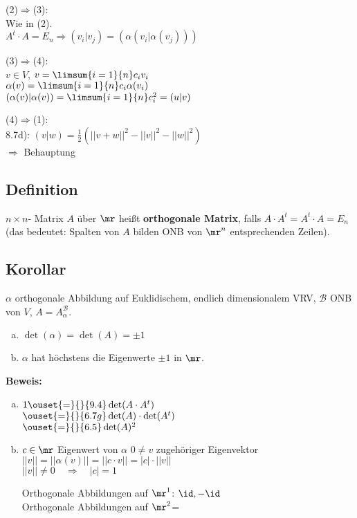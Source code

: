 	(2)$ \Rightarrow $(3):\\
	Wie in (2).\\
	$ A^t\cdot A=E_n\Rightarrow(v_i|v_j)=(\alpha(v_i|\alpha(v_j))) $
	
	(3)$ \Rightarrow $(4):\\
	$ v\in V $, $ v=\limsum{i=1}{n}c_iv_i $\\
	$ \alpha(v)=\limsum{i=1}{n}c_i\alpha(v_i) $\\
	$ (\alpha(v)|\alpha(v))=\limsum{i=1}{n}c_i^2=(u|v) $
	
	(4)$ \Rightarrow $(1):\\
	8.7d): $ (v|w)=\frac{1}{2}(||v+w||^2-||v||^2-||w||^2) $\\
	$ \Rightarrow $ Behauptung
	
\subsection{Definition}
	$ n\times n $- Matrix $ A $ über $ \mr $ heißt \textbf{orthogonale Matrix}, falls $ A\cdot A^t =A^t\cdot A=E_n$\\
	(das bedeutet: Spalten von $ A $ bilden ONB von $ \mr^n $ entsprechenden Zeilen).
	
\subsection{Korollar}
	$ \alpha $ orthogonale Abbildung auf Euklidischem, endlich dimensionalem VRV, $ \mathcal{B} $ ONB von $ V $, $ A=A_\alpha^{\mathcal{B}} $.
	\begin{enumerate}[a)]
		\item $ \det(\alpha)=\det(A)=\pm 1 $
		\item  $ \alpha $ hat höchstens die Eigenwerte $ \pm 1 $ in $ \mr $.
	\end{enumerate}
	
	\textbf{Beweis:}
	\begin{enumerate}[a)]
		\item $ 1\ouset{=}{}{9.4}\det(A\cdot A^t) $\\
		$ \ouset{=}{}{6.7g}\det(A)\cdot\det(A^t) $\\
		$ \ouset{=}{}{6.5}\det(A)^2 $
		\item $ c\in\mr $ Eigenwert von $ \alpha $ $ 0\neq v $ zugehöriger Eigenvektor\\
		$ ||v||=||\alpha(v)||=||c\cdot v||=|c|\cdot||v|| $\\
		$ ||v||\neq 0\quad\Rightarrow\quad |c|=1 $
		
		Orthogonale Abbildungen auf $ \mr^1 $: $ \id, -\id $\\
		Orthogonale Abbildungen auf $ \mr^2 $=
	\end{enumerate}
	
